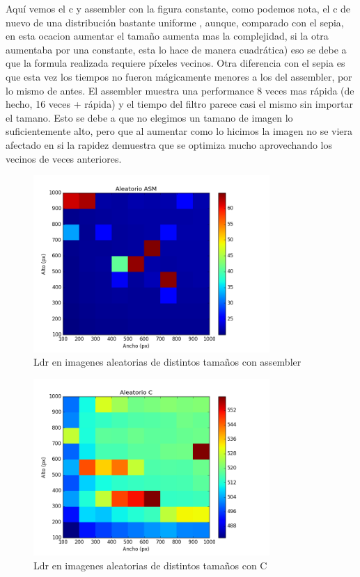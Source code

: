    


   
\hfill \break
Aquí vemos el c y assembler con la figura constante, como podemos nota, el c de nuevo de una distribución bastante uniforme , aunque, comparado con el sepia, en esta ocacion aumentar el tamaño aumenta mas la complejidad, si la otra aumentaba por una constante, esta lo hace de manera cuadrática) eso se debe a que la formula realizada requiere píxeles vecinos. Otra diferencia con el sepia es que esta vez los tiempos no fueron mágicamente menores a los del assembler, por lo mismo de antes. 
El assembler muestra una performance 8 veces mas rápida (de hecho, 16 veces + rápida) y el tiempo del filtro parece casi el mismo sin importar el tamano. Esto se debe a que no elegimos un tamano de imagen lo suficientemente alto, pero que al aumentar como lo hicimos la imagen no se viera afectado en si la rapidez demuestra que se optimiza mucho aprovechando los vecinos de veces anteriores.
\hfill \break

 \begin{figure} [H]
  \centering
  \includegraphics[width=0.8\textwidth]{recursos/aleatorioldrasm.png}
    \caption{ Ldr en imagenes aleatorias de distintos tamaños con assembler }
\end{figure}
 
 \begin{figure} [H]
  \centering
  \includegraphics[width=0.8\textwidth]{recursos/aleatorioldrc.png}
    \caption{ Ldr en imagenes aleatorias de distintos tamaños con C }
\end{figure}
 




